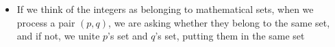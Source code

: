 \documentclass[8pt,a4paper,compress]{beamer}
\begin{document}
\begin{frame}[fragile]
\begin{minipage}{250pt}
\begin{itemize}
\item If we think of the integers as belonging to mathematical sets, when we process a pair $(p, q)$, we are asking whether they belong to the same set, and if not, we unite $p$'s set and $q$'s set, putting them in the same set
\end{itemize}
\end{minipage}%
\begin{minipage}{60pt}
\hfill {}
\end{minipage}
\end{frame}
\end{document}
